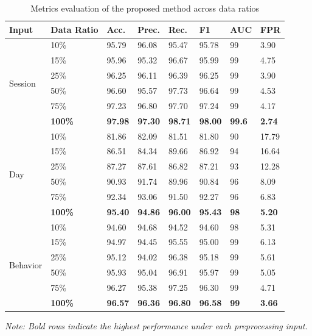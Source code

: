 \begin{table}[!ht]
\centering
\caption{Metrics evaluation of the proposed method across data ratios}
\label{tab:ratio_metrics}
\renewcommand{\arraystretch}{1.3}
\small
\begin{tabular}{|l|l|l|l|l|l|l|l|}
\hline
\textbf{Input} & \textbf{Data Ratio} & \textbf{Acc.} & \textbf{Prec.} & \textbf{Rec.} & \textbf{F1} & \textbf{AUC} & \textbf{FPR}\\
\hline
\multirow{6}{*}{Session} 
 & 10\%  & 95.79 & 96.08 & 95.47 & 95.78 & 99  & 3.90\\
\cline{2-8}
 & 15\%  & 95.96 & 95.32 & 96.67 & 95.99 & 99 & 4.75\\
\cline{2-8}
 & 25\%  & 96.25 & 96.11 & 96.39 & 96.25 & 99  & 3.90\\
\cline{2-8}
 & 50\%  & 96.60 & 95.57 & 97.73 & 96.64 & 99  & 4.53\\
\cline{2-8}
 & 75\%  & 97.23 & 96.80 & 97.70 & 97.24 & 99  & 4.17\\
\cline{2-8}
 & \textbf{100\%} & \textbf{97.98} & \textbf{97.30} & \textbf{98.71} & \textbf{98.00} & \textbf{99.6}  & \textbf{2.74}\\
\hline
\multirow{6}{*}{Day} 
 & 10\%  & 81.86 & 82.09 & 81.51 & 81.80 & 90  & 17.79\\
\cline{2-8}
 & 15\%  & 86.51 & 84.34 & 89.66 & 86.92 & 94  & 16.64\\
\cline{2-8}
 & 25\%  & 87.27 & 87.61 & 86.82 & 87.21 & 93  & 12.28\\
\cline{2-8}
 & 50\%  & 90.93 & 91.74 & 89.96 & 90.84 & 96  & 8.09\\
\cline{2-8}
 & 75\%  & 92.34 & 93.06 & 91.50 & 92.27 & 96  & 6.83\\
\cline{2-8}
 & \textbf{100\%} & \textbf{95.40} & \textbf{94.86} & \textbf{96.00} & \textbf{95.43} & \textbf{98}  & \textbf{5.20}\\
\hline
\multirow{6}{*}{Behavior} 
 & 10\%  & 94.60 & 94.68 & 94.52 & 94.60 & 98  & 5.31\\
\cline{2-8}
 & 15\%  & 94.97 & 94.45 & 95.55 & 95.00 & 99 & 6.13\\
\cline{2-8}
 & 25\%  & 95.12 & 94.02 & 96.38 & 95.18 & 99  & 5.61\\
\cline{2-8}
 & 50\%  & 95.93 & 95.04 & 96.91 & 95.97 & 99  & 5.05\\
\cline{2-8}
 & 75\%  & 96.27 & 95.38 & 97.25 & 96.30 & 99  & 4.71\\
\cline{2-8}
 & \textbf{100\%} & \textbf{96.57} & \textbf{96.36} & \textbf{96.80} & \textbf{96.58} & \textbf{99}  & \textbf{3.66}\\
\hline
\end{tabular}

\vspace{2mm}
\scriptsize{\textit{Note: Bold rows indicate the highest performance under each preprocessing input.}}
\end{table}



